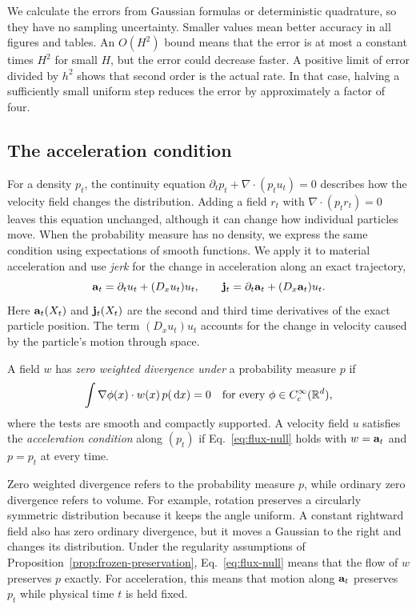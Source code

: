 We calculate the errors from Gaussian formulas or deterministic quadrature, so they have no sampling uncertainty. Smaller values mean better accuracy in all figures and tables. An $O(H^2)$ bound means that the error is at most a constant times $H^2$ for small $H$, but the error could decrease faster. A positive limit of error divided by $h^2$ shows that second order is the actual rate. In that case, halving a sufficiently small uniform step reduces the error by approximately a factor of four.

\subsection{The acceleration condition}
\label{sec:condition}

For a density $p_t$, the continuity equation $\partial_t p_t+\nabla\cdot(p_tu_t)=0$ describes how the velocity field changes the distribution. Adding a field $r_t$ with $\nabla\cdot(p_tr_t)=0$ leaves this equation unchanged, although it can change how individual particles move. When the probability measure has no density, we express the same condition using expectations of smooth functions. We apply it to material acceleration and use \emph{jerk} for the change in acceleration along an exact trajectory,
\begin{equation}
 \mathbf a_t=\partial_tu_t+(D_xu_t)u_t,\qquad
 \mathbf j_t=\partial_t\mathbf a_t+(D_x\mathbf a_t)u_t.
 \label{eq:acceleration}
\end{equation}
Here $\mathbf a_t(X_t)$ and $\mathbf j_t(X_t)$ are the second and third time derivatives of the exact particle position. The term $(D_xu_t)u_t$ accounts for the change in velocity caused by the particle's motion through space.

\begin{definition}
\label{def:flux}
A field $w$ has \emph{zero weighted divergence under} a probability measure $p$ if
\begin{equation}
 \int \nabla\phi(x)\cdot w(x)\,p(\,\mathrm d x)=0
 \quad\text{for every }\phi\in C_c^\infty(\mathbb R^d),
 \label{eq:flux-null}
\end{equation}
where the tests are smooth and compactly supported. A velocity field $u$ satisfies the \emph{acceleration condition} along $(p_t)$ if Eq.~\eqref{eq:flux-null} holds with $w=\mathbf a_t$ and $p=p_t$ at every time.
\end{definition}

Zero weighted divergence refers to the probability measure $p$, while ordinary zero divergence refers to volume. For example, rotation preserves a circularly symmetric distribution because it keeps the angle uniform. A constant rightward field also has zero ordinary divergence, but it moves a Gaussian to the right and changes its distribution. Under the regularity assumptions of Proposition~\ref{prop:frozen-preservation}, Eq.~\eqref{eq:flux-null} means that the flow of $w$ preserves $p$ exactly. For acceleration, this means that motion along $\mathbf a_t$ preserves $p_t$ while physical time $t$ is held fixed.

